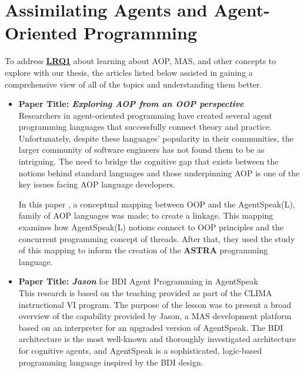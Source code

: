\section{Assimilating Agents and Agent-Oriented Programming}

To address \hyperref[LRQ1.]{\textbf{LRQ1}} about learning about \ac{AOP}, \ac{MAS}, and other concepts to explore with our thesis, the articles listed below assisted in gaining a comprehensive view of all of the topics and understanding them better.

\begin{itemize}[label={}]
\item \textbf{Paper Title: \textit{Exploring \ac{AOP} from an \ac{OOP} perspective}}\\

Researchers in agent-oriented programming have created several agent programming languages that successfully connect theory and practice. Unfortunately, despite these languages' popularity in their communities, the larger community of software engineers has not found them to be as intriguing. The need to bridge the cognitive gap that exists between the notions behind standard languages and those underpinning \ac{AOP} is one of the key issues facing \ac{AOP} language developers. 
 
 \vspace{.5cm}
 
In this paper \cite{astra}, a conceptual mapping between \ac{OOP} and the AgentSpeak(L), family of \ac{AOP} languages was made; to create a linkage. This mapping examines how AgentSpeak(L) notions connect to \ac{OOP} principles and the concurrent programming concept of threads. After that, they used the study of this mapping to inform the creation of the \textbf{ASTRA} programming language.

 \vspace{.5cm}
 
\item \textbf{Paper Title: \textit{Jason}} for \ac{BDI} Agent Programming in AgentSpeak \\

This research \cite{jasonBDI} is based on the teaching provided as part of the CLIMA instructional VI program. The purpose of the lesson was to present a broad overview of the capability provided by Jason, a \ac{MAS} development platform based on an interpreter for an upgraded version of AgentSpeak. The \ac{BDI} architecture is the most well-known and thoroughly investigated architecture for cognitive agents, and AgentSpeak is a sophisticated, logic-based programming language inspired by the \ac{BDI} design.


\end{itemize}
